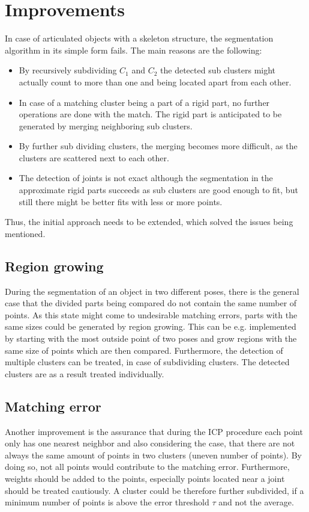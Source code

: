 \chapter{Improvements}

In case of articulated objects with a skeleton structure, the segmentation algorithm in its simple form fails. The main reasons are the following:
\begin{itemize}
	\item By recursively subdividing $C_1$ and $C_2$ the detected sub clusters might actually count to more than one and being located apart from each other. 
	\item In case of a matching cluster being a part of a rigid part, no further operations are done with the match. The rigid part is anticipated to be generated by merging neighboring sub clusters.
	\item By further sub dividing clusters, the merging becomes more difficult, as the clusters are scattered next to each other.
	\item The detection of joints is not exact although the segmentation in the approximate rigid parts succeeds as sub clusters are good enough to fit, but still there might be better fits with less or more points.
\end{itemize}
Thus, the initial approach needs to be extended, which solved the issues being mentioned.

\section{Region growing}
During the segmentation of an object in two different poses, there is the general case that the divided parts being compared do not contain the same number of points. As this state might come to undesirable matching errors, parts with the same sizes could be generated by region growing. This can be e.g. implemented by starting with the most outside point of two poses and grow regions with the same size of points which are then compared. Furthermore, the detection of multiple clusters can be treated, in case of subdividing clusters. The detected clusters are as a result treated individually.

\section{Matching error}
Another improvement is the assurance that during the ICP procedure each point only has one nearest neighbor and also considering the case, that there are not always the same amount of points in two clusters (uneven number of points). By doing so, not all points would contribute to the matching error. Furthermore, weights should be added to the points, especially points located near a joint should be treated cautiously. A cluster could be therefore further subdivided, if a minimum number of points is above the error threshold $\tau$ and not the average. 

